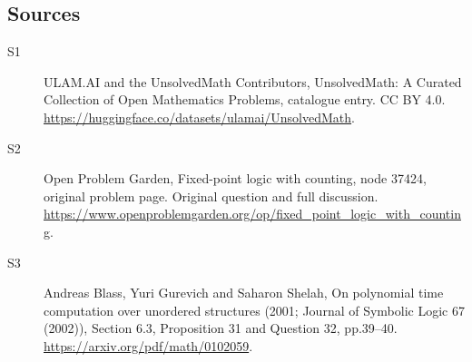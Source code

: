 \documentclass[11pt]{article}
\begin{document}
\subsection{Sources}
\begin{description}
\item[\hypertarget{source:statement:1}{S1}] ULAM.AI and the UnsolvedMath Contributors, UnsolvedMath: A Curated Collection of Open Mathematics Problems, catalogue entry. CC BY 4.0. \url{https://huggingface.co/datasets/ulamai/UnsolvedMath}.
\item[\hypertarget{source:statement:2}{S2}] Open Problem Garden, Fixed-point logic with counting, node 37424, original problem page. Original question and full discussion. \url{https://www.openproblemgarden.org/op/fixed_point_logic_with_counting}.
\item[\hypertarget{source:statement:3}{S3}] Andreas Blass, Yuri Gurevich and Saharon Shelah, On polynomial time computation over unordered structures (2001; Journal of Symbolic Logic 67 (2002)), Section 6.3, Proposition 31 and Question 32, pp.39–40. \url{https://arxiv.org/pdf/math/0102059}.
\end{description}
\label{end:statement}
\end{document}

